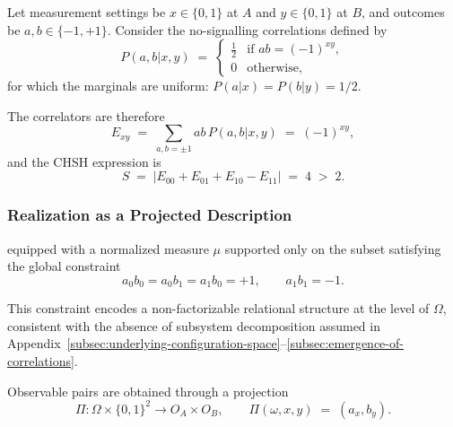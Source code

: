 \documentclass[quantumrep,article,accept,pdftex,oneauthor]{Definitions/mdpi}
\theoremstyle{remark}
\begin{document}
    Let measurement settings be $x\in\{0,1\}$ at $A$ and $y\in\{0,1\}$ at $B$,
    and outcomes be $a,b\in\{-1,+1\}$.
    Consider the no-signalling correlations defined by
\begin{equation}
      P(a,b|x,y)
      \;=\;
      \begin{cases}
        \tfrac12 & \text{if } ab = (-1)^{xy},\\
        0 & \text{otherwise,}
      \end{cases}
      \label{eq:prbox_distribution}
    \end{equation}
    for which the marginals are uniform: $P(a|x)=P(b|y)=1/2$.

    The correlators are therefore
\begin{equation}
      E_{xy} \;=\; \sum_{a,b=\pm 1} ab\,P(a,b|x,y) \;=\; (-1)^{xy},
      \label{eq:prbox_correlators}
    \end{equation}
    and the CHSH expression is
\begin{equation}
      S \;=\; \bigl|E_{00}+E_{01}+E_{10}-E_{11}\bigr|
      \;=\; 4 \;>\; 2.
      \label{eq:chsh_violation}
    \end{equation}

    \subsubsection*{Realization as a Projected Description}
     equipped with a
    normalized measure $\mu$ supported only on the subset satisfying the global
    constraint
\begin{equation}
      a_0 b_0 = a_0 b_1 = a_1 b_0 = +1, \qquad a_1 b_1 = -1.
      \label{eq:global_constraint}
    \end{equation}

    This constraint encodes a non-factorizable relational structure at the level of
    $\Omega$, consistent with the absence of subsystem decomposition assumed in
    Appendix~\ref{subsec:underlying-configuration-space}--\ref{subsec:emergence-of-correlations}.

    Observable pairs are obtained through a projection
\begin{equation}
      \Pi:\Omega \times \{0,1\}^2 \to O_A\times O_B,\qquad
      \Pi(\omega,x,y) \;=\; (a_x,b_y).
      \label{eq:contextual_projection}
    \end{equation}
\end{document}
